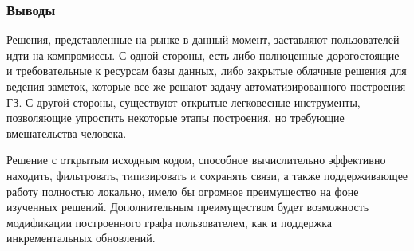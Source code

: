 \subsubsection*{Выводы}
Решения, представленные на рынке в данный момент, заставляют пользователей идти на компромиссы.
С одной стороны, есть либо полноценные дорогостоящие и требовательные к ресурсам базы данных,
либо закрытые облачные решения для ведения заметок,
которые все же решают задачу автоматизированного построения ГЗ.
С другой стороны, существуют открытые легковесные инструменты,
позволяющие упростить некоторые этапы построения,
но требующие вмешательства человека.

Решение с открытым исходным кодом, способное вычислительно эффективно находить,
фильтровать, типизировать и сохранять связи, а также поддерживающее работу полностью локально,
имело бы огромное преимущество на фоне изученных решений.
Дополнительным преимуществом будет возможность модификации построенного графа пользователем,
как и поддержка инкрементальных обновлений.

